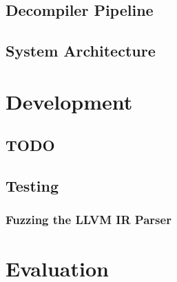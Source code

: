 \documentclass[12pt, a4paper]{article}
\begin{document}

\subsection{Decompiler Pipeline}


\subsection{System Architecture}



\section{Development}


\subsection{TODO}


\subsection{Testing}


\subsubsection{Fuzzing the LLVM IR Parser}



\section{Evaluation}
\end{document}

